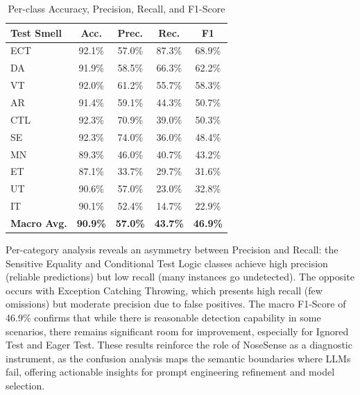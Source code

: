 \documentclass[sigconf]{acmart}
\begin{document}
\begin{table}[htb]
    \centering
    \caption{Per-class Accuracy, Precision, Recall, and F1-Score}
    \label{tab:precision_recall}
    \renewcommand{\arraystretch}{1.2}
    \footnotesize
    \begin{tabular}{lcccc}
        \toprule
        \textbf{Test Smell} & \textbf{Acc.} & \textbf{Prec.} & \textbf{Rec.} & \textbf{F1} \\
        \midrule
        ECT & 92.1\% & 57.0\% & 87.3\% & 68.9\% \\
        DA      & 91.9\% & 58.5\% & 66.3\% & 62.2\% \\
        VT          & 92.0\% & 61.2\% & 55.7\% & 58.3\% \\
        AR    & 91.4\% & 59.1\% & 44.3\% & 50.7\% \\
        CTL      & 92.3\% & 70.9\% & 39.0\% & 50.3\% \\
        SE    & 92.3\% & 74.0\% & 36.0\% & 48.4\% \\
        MN     & 89.3\% & 46.0\% & 40.7\% & 43.2\% \\
        ET            & 87.1\% & 33.7\% & 29.7\% & 31.6\% \\
        UT          & 90.6\% & 57.0\% & 23.0\% & 32.8\% \\
        IT          & 90.1\% & 52.4\% & 14.7\% & 22.9\% \\
        \midrule
        \textbf{Macro Avg.}   & \textbf{90.9\%} & \textbf{57.0\%} & \textbf{43.7\%} & \textbf{46.9\%} \\
        \bottomrule
    \end{tabular}
\end{table}


Per-category analysis reveals an asymmetry between Precision and Recall: the Sensitive Equality and Conditional Test Logic classes achieve high precision (reliable predictions) but low recall (many instances go undetected). The opposite occurs with Exception Catching Throwing, which presents high recall (few omissions) but moderate precision due to false positives. The macro F1-Score of 46.9\% confirms that while there is reasonable detection capability in some scenarios, there remains significant room for improvement, especially for Ignored Test and Eager Test. These results reinforce the role of NoseSense as a diagnostic instrument, as the confusion analysis maps the semantic boundaries where LLMs fail, offering actionable insights for prompt engineering refinement and model selection.
\end{document}
